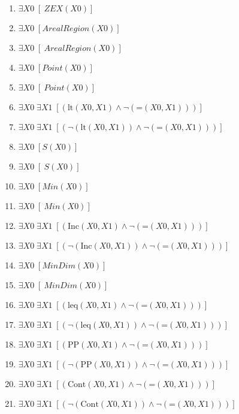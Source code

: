 \documentclass{article}
\begin{document}
\begin{enumerate}
\item $\exists X0\;  \left[ ~ZEX(X0) \right]$
\item $\exists X0\;  \left[ ArealRegion(X0) \right]$
\item $\exists X0\;  \left[ ~ArealRegion(X0) \right]$
\item $\exists X0\;  \left[ Point(X0) \right]$
\item $\exists X0\;  \left[ ~Point(X0) \right]$
\item $\exists X0\; \exists X1\;  \left[ \left(\textrm{lt}(X0,X1) \land \neg \left(\textrm{=}(X0,X1)\right)\right) \right]$
\item $\exists X0\; \exists X1\;  \left[ \left(\neg \left(\textrm{lt}(X0,X1)\right) \land \neg \left(\textrm{=}(X0,X1)\right)\right) \right]$
\item $\exists X0\;  \left[ S(X0) \right]$
\item $\exists X0\;  \left[ ~S(X0) \right]$
\item $\exists X0\;  \left[ Min(X0) \right]$
\item $\exists X0\;  \left[ ~Min(X0) \right]$
\item $\exists X0\; \exists X1\;  \left[ \left(\textrm{Inc}(X0,X1) \land \neg \left(\textrm{=}(X0,X1)\right)\right) \right]$
\item $\exists X0\; \exists X1\;  \left[ \left(\neg \left(\textrm{Inc}(X0,X1)\right) \land \neg \left(\textrm{=}(X0,X1)\right)\right) \right]$
\item $\exists X0\;  \left[ MinDim(X0) \right]$
\item $\exists X0\;  \left[ ~MinDim(X0) \right]$
\item $\exists X0\; \exists X1\;  \left[ \left(\textrm{leq}(X0,X1) \land \neg \left(\textrm{=}(X0,X1)\right)\right) \right]$
\item $\exists X0\; \exists X1\;  \left[ \left(\neg \left(\textrm{leq}(X0,X1)\right) \land \neg \left(\textrm{=}(X0,X1)\right)\right) \right]$
\item $\exists X0\; \exists X1\;  \left[ \left(\textrm{PP}(X0,X1) \land \neg \left(\textrm{=}(X0,X1)\right)\right) \right]$
\item $\exists X0\; \exists X1\;  \left[ \left(\neg \left(\textrm{PP}(X0,X1)\right) \land \neg \left(\textrm{=}(X0,X1)\right)\right) \right]$
\item $\exists X0\; \exists X1\;  \left[ \left(\textrm{Cont}(X0,X1) \land \neg \left(\textrm{=}(X0,X1)\right)\right) \right]$
\item $\exists X0\; \exists X1\;  \left[ \left(\neg \left(\textrm{Cont}(X0,X1)\right) \land \neg \left(\textrm{=}(X0,X1)\right)\right) \right]$

\end{enumerate}
\end{document}
